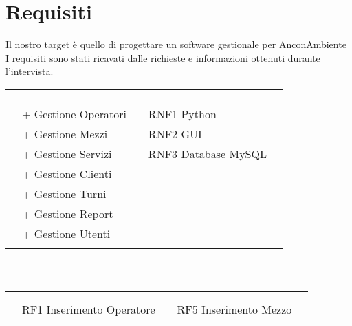 \documentclass[green, fancy, 11pt]{elegantbook}
\begin{document}
\section{Requisiti}
Il nostro target è quello di progettare un software gestionale per AnconAmbiente
I requisiti sono stati ricavati dalle richieste e informazioni ottenuti durante l'intervista.
\begin{center}
\noindent
\begin{tabular}{|p{0.2cm} p{2.5cm} p{1.85cm} p{0.2cm} p{2.5cm} p{1.85cm} p{0.2cm}|}
	\hline
	\multicolumn{7}{|c|}{\cellcolor{DarkGreen}{\textcolor{white}{REQUISITI}}}\\
	\hline
	&&&&&&\\
	\cline{2-3} \cline{5-6}
	&\multicolumn{2}{|l|}{\cellcolor{RussianGreen}{\textcolor{white}{FUNZIONALI}}}&&\multicolumn{2}{|l|}{\cellcolor{RussianGreen}{\textcolor{white}{NON FUNZIONALI}}}&\\
	\cline{2-3} \cline{5-6}
	&\multicolumn{2}{|l|}{+ Gestione Operatori}&&\multicolumn{2}{|l|}{RNF1 Python}&\\ 
	&\multicolumn{2}{|l|}{+ Gestione Mezzi}&&\multicolumn{2}{|l|}{RNF2 GUI}&\\ 
	&\multicolumn{2}{|l|}{+ Gestione Servizi}&&\multicolumn{2}{|l|}{RNF3 Database MySQL}&\\ 
	\cline{5-6}
	&\multicolumn{2}{|l|}{+ Gestione Clienti}&&&&\\
	&\multicolumn{2}{|l|}{+ Gestione Turni}&&&&\\
	&\multicolumn{2}{|l|}{+ Gestione Report}&&&&\\
	&\multicolumn{2}{|l|}{+ Gestione Utenti}&&&&\\
	\cline{2-3}
	&&&&&&\\
	\hline
\end{tabular}
\\
\begin{tabular}{|p{0.2cm} p{2.5cm} p{2cm} p{0.2cm} p{2.5cm} p{1cm} p{0.2cm}|}
	\hline
	\multicolumn{7}{|c|}{\cellcolor{DarkGreen}{\textcolor{white}{REQUISITI FUNZIONALI}}}\\
	\hline
	&&&&&&\\
	\cline{2-3} \cline{5-6}
	&\multicolumn{2}{|l|}{\cellcolor{RussianGreen}{\textcolor{white}{GESTIONE OPERATORI}}}&&\multicolumn{2}{|l|}{\cellcolor{RussianGreen}{\textcolor{white}{GESTIONE MEZZI}}}&\\
	\cline{2-3} \cline{5-6}
	&\multicolumn{2}{|l|}{RF1 Inserimento Operatore}&&\multicolumn{2}{|l|}{RF5 Inserimento Mezzo}&\\

\end{tabular}
\end{center}
\end{document}
